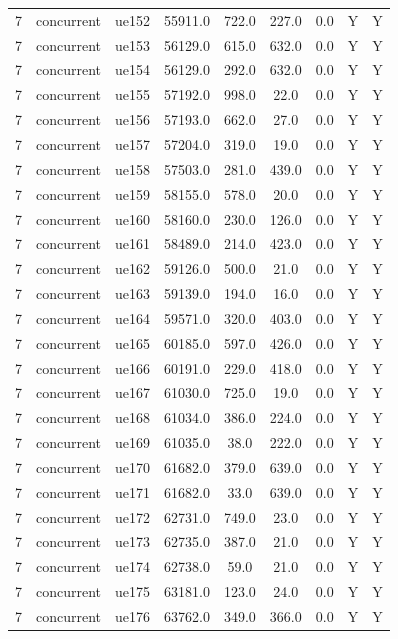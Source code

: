\begin{table}[ht]
\begin{tabular}{|c|c|c|c|c|c|c|c|c|}
7 & concurrent & ue152 & 55911.0 & 722.0 & 227.0 & 0.0 & Y & Y \\
7 & concurrent & ue153 & 56129.0 & 615.0 & 632.0 & 0.0 & Y & Y \\
7 & concurrent & ue154 & 56129.0 & 292.0 & 632.0 & 0.0 & Y & Y \\
7 & concurrent & ue155 & 57192.0 & 998.0 & 22.0 & 0.0 & Y & Y \\
7 & concurrent & ue156 & 57193.0 & 662.0 & 27.0 & 0.0 & Y & Y \\
7 & concurrent & ue157 & 57204.0 & 319.0 & 19.0 & 0.0 & Y & Y \\
7 & concurrent & ue158 & 57503.0 & 281.0 & 439.0 & 0.0 & Y & Y \\
7 & concurrent & ue159 & 58155.0 & 578.0 & 20.0 & 0.0 & Y & Y \\
7 & concurrent & ue160 & 58160.0 & 230.0 & 126.0 & 0.0 & Y & Y \\
7 & concurrent & ue161 & 58489.0 & 214.0 & 423.0 & 0.0 & Y & Y \\
7 & concurrent & ue162 & 59126.0 & 500.0 & 21.0 & 0.0 & Y & Y \\
7 & concurrent & ue163 & 59139.0 & 194.0 & 16.0 & 0.0 & Y & Y \\
7 & concurrent & ue164 & 59571.0 & 320.0 & 403.0 & 0.0 & Y & Y \\
7 & concurrent & ue165 & 60185.0 & 597.0 & 426.0 & 0.0 & Y & Y \\
7 & concurrent & ue166 & 60191.0 & 229.0 & 418.0 & 0.0 & Y & Y \\
7 & concurrent & ue167 & 61030.0 & 725.0 & 19.0 & 0.0 & Y & Y \\
7 & concurrent & ue168 & 61034.0 & 386.0 & 224.0 & 0.0 & Y & Y \\
7 & concurrent & ue169 & 61035.0 & 38.0 & 222.0 & 0.0 & Y & Y \\
7 & concurrent & ue170 & 61682.0 & 379.0 & 639.0 & 0.0 & Y & Y \\
7 & concurrent & ue171 & 61682.0 & 33.0 & 639.0 & 0.0 & Y & Y \\
7 & concurrent & ue172 & 62731.0 & 749.0 & 23.0 & 0.0 & Y & Y \\
7 & concurrent & ue173 & 62735.0 & 387.0 & 21.0 & 0.0 & Y & Y \\
7 & concurrent & ue174 & 62738.0 & 59.0 & 21.0 & 0.0 & Y & Y \\
7 & concurrent & ue175 & 63181.0 & 123.0 & 24.0 & 0.0 & Y & Y \\
7 & concurrent & ue176 & 63762.0 & 349.0 & 366.0 & 0.0 & Y & Y \\

\end{tabular}
\end{table}
